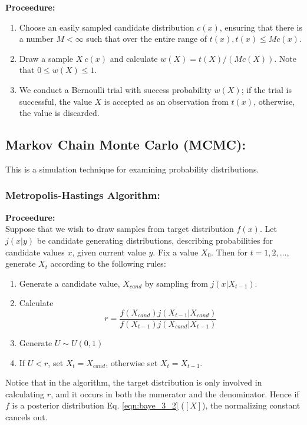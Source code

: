 \documentclass[12pt,oneside,a4paper]{book}
\theoremstyle{definition}
\theoremstyle{remark}
\begin{document}
					\textbf{Proceedure:}
					\begin{enumerate}
						\item[i.] Choose an easily sampled candidate distribution $c(x)$, ensuring that there is a number $M < \infty$ such that over the entire range of $t(x), t(x) \le Mc(x)$.
						\item[ii.] Draw a sample $X ~ c(x)$ and calculate $w(X) = t(X)/(Mc(X))$. Note that $0 \le w(X) \le 1$.
						\item[iii.] We conduct a Bernoulli trial with success probability $w(X)$; if the trial is successful, the value
						$X$ is accepted as an observation from $t(x)$, otherwise, the value is discarded.
					\end{enumerate}

			\subsection{Markov Chain Monte Carlo (MCMC):}
				This is a simulation technique for examining probability distributions.

				\subsubsection{Metropolis-Hastings Algorithm:}
					\textbf{Proceedure:}\\
					Suppose that we wish to draw samples from target distribution $f(x)$.  Let $j(x|y)$ be candidate generating distributions, describing probabilities for candidate values $x$, given current value $y$.
					Fix a value $X_0$. Then for $t=1,2,\dots$, generate $X_t$ according to the following rules:
					\begin{enumerate}
						\item Generate a candidate value, $X_{cand}$ by sampling from $j(x|X_{t-1})$.
						\item Calculate $$r =\frac{f(X_{cand})j(X_{t-1}|X_{cand})}{f(X_{t-1})j(X_{cand}|X_{t-1})} $$
						\item Generate $U \sim U(0,1)$
						\item If $U<r$, set $X_t = X_{cand}$, otherwise set $X_t = X_{t-1}$.
					\end{enumerate}

					Notice that in the algorithm, the target distribution is only involved in calculating $r$, and it occurs in both the numerator and the denominator. Hence if $f$ is a posterior distribution Eq. \eqref{eqn:baye_3_2} ($[X]$), the normalizing constant cancels out.\\
\end{document}

